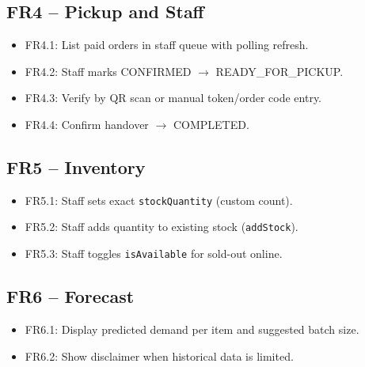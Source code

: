 \subsection{FR4 -- Pickup and Staff}
\begin{itemize}
  \item FR4.1: List paid orders in staff queue with polling refresh.
  \item FR4.2: Staff marks CONFIRMED $\rightarrow$ READY\_FOR\_PICKUP.
  \item FR4.3: Verify by QR scan or manual token/order code entry.
  \item FR4.4: Confirm handover $\rightarrow$ COMPLETED.
\end{itemize}

\subsection{FR5 -- Inventory}
\begin{itemize}
  \item FR5.1: Staff sets exact \texttt{stockQuantity} (custom count).
  \item FR5.2: Staff adds quantity to existing stock (\texttt{addStock}).
  \item FR5.3: Staff toggles \texttt{isAvailable} for sold-out online.
\end{itemize}

\subsection{FR6 -- Forecast}
\begin{itemize}
  \item FR6.1: Display predicted demand per item and suggested batch size.
  \item FR6.2: Show disclaimer when historical data is limited.
\end{itemize}

